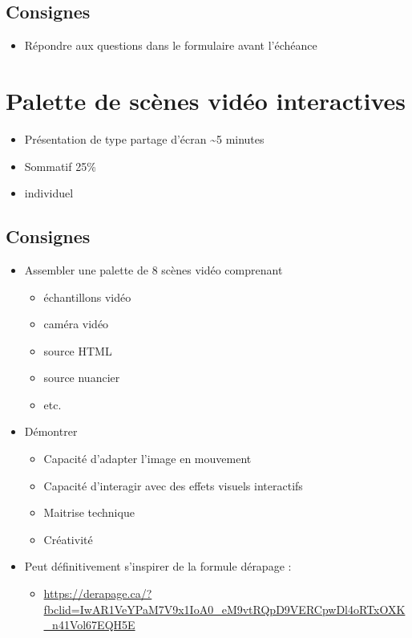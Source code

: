 \documentclass[
  french,
]{book}
\providecommand{\tightlist}{%
  \setlength{\itemsep}{0pt}\setlength{\parskip}{0pt}}
\begin{document}
\hypertarget{consignes-2}{%
\subsection{Consignes}\label{consignes-2}}

\begin{itemize}
\tightlist
\item
  Répondre aux questions dans le formulaire avant l'échéance
\end{itemize}

\hypertarget{sommatif_4}{%
\section{Palette de scènes vidéo interactives}\label{sommatif_4}}

\begin{itemize}
\tightlist
\item
  Présentation de type partage d'écran \textasciitilde5 minutes
\item
  Sommatif 25\%
\item
  individuel
\end{itemize}

\hypertarget{consignes-3}{%
\subsection{Consignes}\label{consignes-3}}

\begin{itemize}
\tightlist
\item
  Assembler une palette de 8 scènes vidéo comprenant

  \begin{itemize}
  \tightlist
  \item
    échantillons vidéo
  \item
    caméra vidéo
  \item
    source HTML
  \item
    source nuancier
  \item
    etc.
  \end{itemize}
\item
  Démontrer

  \begin{itemize}
  \tightlist
  \item
    Capacité d'adapter l'image en mouvement
  \item
    Capacité d'interagir avec des effets visuels interactifs
  \item
    Maitrise technique
  \item
    Créativité
  \end{itemize}
\item
  Peut définitivement s'inspirer de la formule dérapage :

  \begin{itemize}
  \tightlist
  \item
    \url{https://derapage.ca/?fbclid=IwAR1VeYPaM7V9x1IoA0_eM9vtRQpD9VERCpwDl4oRTxOXK_n41Vol67EQH5E}
  \end{itemize}
\end{itemize}
\end{document}
